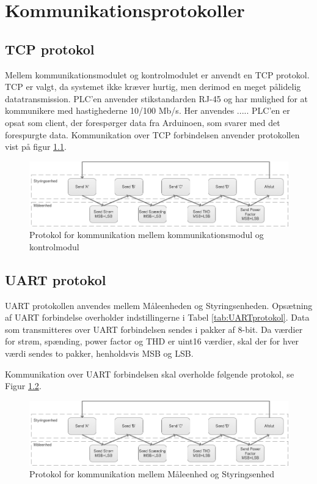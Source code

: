 
\chapter{Kommunikationsprotokoller}
\label{ch:KomProtokol}

\section{TCP protokol}
\label{sec:TCPprotokol}
Mellem kommunikationsmodulet og kontrolmodulet er anvendt en TCP protokol. TCP er valgt, da systemet ikke kræver hurtig, men derimod en meget pålidelig datatransmission. PLC'en anvender stikstandarden RJ-45 og har mulighed for at kommunikere med hastighederne 10/100 Mb/s. Her anvendes .....
PLC'en er opsat som client, der forespørger data fra Arduinoen, som svarer med det forespurgte data. Kommunikation over TCP forbindelsen anvender protokollen vist på figur \ref{fig:TCPprotokol}.

\begin{figure}[H] %
	\centering
	\includegraphics[width=\textwidth]{Figure/UARTprotokol}
	\caption{Protokol for kommunikation mellem kommunikationsmodul og kontrolmodul}
	\label{fig:TCPprotokol}
\end{figure}

\section{UART protokol}
\label{sec:UARTprotokol}
UART protokollen anvendes mellem Måleenheden og Styringsenheden. Opsætning af UART forbindelse overholder indstillingerne i Tabel \ref{tab:UARTprotokol}. Data som transmitteres over UART forbindelsen sendes i pakker af 8-bit. Da værdier for strøm, spænding, power factor og THD er uint16 værdier, skal der for hver værdi sendes to pakker, henholdsvis MSB og LSB. 

Kommunikation over UART forbindelsen skal overholde følgende protokol, se Figur \ref{fig:UARTprotokol}.
\begin{figure}[H] %
	\centering
	\includegraphics[width=\textwidth]{Figure/UARTprotokol}
	\caption{Protokol for kommunikation mellem Måleenhed og Styringsenhed}
	\label{fig:UARTprotokol}
\end{figure}

